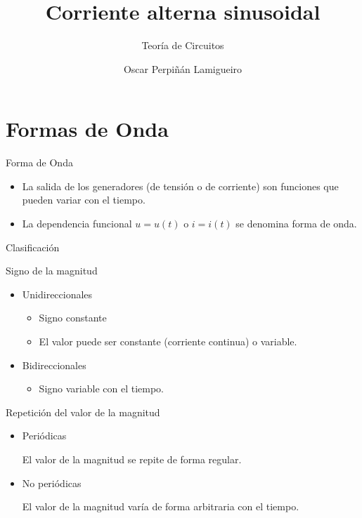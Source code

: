 \documentclass[aspectratio=169, usenames,svgnames,dvipsnames]{beamer}
\author{Oscar Perpiñán Lamigueiro}
\date{}
\title{Corriente alterna sinusoidal}
\subtitle{Teoría de Circuitos}
\begin{document}
\maketitle

\section{Formas de Onda}
\label{sec:orgf89fccf}

\begin{frame}[label={sec:org89598b2}]{Forma de Onda}
\begin{itemize}
\item La salida de los generadores (de tensión o de corriente) son funciones que pueden variar con el tiempo.
\item La dependencia funcional \(u = u(t)\) o \(i = i(t)\) se denomina forma de onda.
\end{itemize}
\end{frame}
\begin{frame}[label={sec:org30cbb1b}]{Clasificación}
\begin{block}{Signo de la magnitud}
\begin{itemize}
\item Unidireccionales
\begin{itemize}
\item Signo constante
\item El valor puede ser constante (corriente continua) o variable.
\end{itemize}
\item Bidireccionales
\begin{itemize}
\item Signo variable con el tiempo.
\end{itemize}
\end{itemize}
\end{block}
\begin{block}{Repetición del valor de la magnitud}
\begin{itemize}
\item Periódicas

El valor de la magnitud se repite de forma regular.

\item No periódicas

El valor de la magnitud varía de forma arbitraria con el tiempo.
\end{itemize}
\end{block}
\end{frame}
\end{document}
